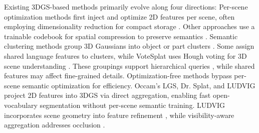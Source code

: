 \documentclass[10pt,twocolumn,letterpaper]{article}
\begin{document}
Existing 3DGS-based methods primarily evolve along four directions:
Per-scene optimization methods first inject and optimize 2D features per scene, often employing dimensionality reduction for compact storage \cite{qin2024langsplat, zhou2024feature, guo2024semantic, qu2024goi, wu2024opengaussian, zuo2025fmgs}. Other approaches use a trainable codebook for spatial compression to preserve semantics \cite{qu2024goi,tian2025ccl}.
Semantic clustering methods group 3D Gaussians into object or part clusters \cite{li2025instancegaussian,liang2024supergseg,piekenbrinck2025opensplat3d,wu2024opengaussian}. Some assign shared language features to clusters, while VoteSplat uses Hough voting for 3D scene understanding \cite{jiang2025votesplat}. These groupings support hierarchical queries \cite{liang2024supergseg,zhan2025hi}, while shared features may affect fine-grained details.
Optimization-free methods bypass per-scene semantic optimization for efficiency. Occam's LGS, Dr. Splat, and LUDVIG \cite{cheng2024occamslgssimpleapproach,drsplat25,marrie2025ludvig} project 2D features into 3DGS \cite{kerbl3Dgaussians} via direct aggregation, enabling fast open-vocabulary segmentation without per-scene semantic training. LUDVIG incorporates scene geometry into feature refinement \cite{marrie2025ludvig}, while visibility-aware aggregation addresses occlusion \cite{wang2025vala}.
\end{document}
